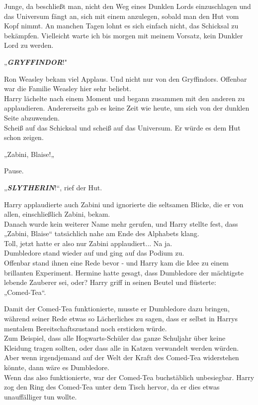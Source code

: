 {Junge, da beschließt man, nicht den Weg eines Dunklen Lords einzuschlagen und das Universum fängt an, sich mit einem anzulegen, sobald man den Hut vom Kopf nimmt. An manchen Tagen lohnt es sich einfach nicht, das Schicksal zu bekämpfen. Vielleicht warte ich bis morgen mit meinem Vorsatz, kein Dunkler Lord zu werden.

„\textbf{\emph{GRYFFINDOR}}!"

Ron Weasley bekam viel Applaus. Und nicht nur von den Gryffindors. Offenbar war die Familie Weasley hier sehr beliebt.\\ Harry lächelte nach einem Moment und begann zusammen mit den anderen zu applaudieren. Andererseits gab es keine Zeit wie heute, um sich von der dunklen Seite abzuwenden.\\ Scheiß auf das Schicksal und scheiß auf das Universum. Er würde es dem Hut schon zeigen.

„Zabini, Blaise!„

Pause.

„\textbf{\emph{SLYTHERIN}}!“, rief der Hut.

Harry applaudierte auch Zabini und ignorierte die seltsamen Blicke, die er von allen, einschließlich Zabini, bekam.\\ Danach wurde kein weiterer Name mehr gerufen, und Harry stellte fest, dass\\ „Zabini, Blaise“ tatsächlich nahe am Ende des Alphabets klang.\\ Toll, jetzt hatte er also nur Zabini applaudiert... Na ja.\\ Dumbledore stand wieder auf und ging auf das Podium zu.\\ Offenbar stand ihnen eine Rede bevor - und Harry kam die Idee zu einem brillanten Experiment. Hermine hatte gesagt, dass Dumbledore der mächtigste lebende Zauberer sei, oder? Harry griff in seinen Beutel und flüsterte:\\ „Comed-Tea“.

Damit der Comed-Tea funktionierte, musste er Dumbledore dazu bringen, während seiner Rede etwas so Lächerliches zu sagen, dass er selbst in Harrys mentalem Bereitschaftszustand noch ersticken würde.\\ Zum Beispiel, dass alle Hogwarts-Schüler das ganze Schuljahr über keine Kleidung tragen sollten, oder dass alle in Katzen verwandelt werden würden.\\ Aber wenn irgendjemand auf der Welt der Kraft des Comed-Tea widerstehen könnte, dann wäre es Dumbledore.\\ Wenn das also funktionierte, war der Comed-Tea buchstäblich unbesiegbar. Harry zog den Ring des Comed-Tea unter dem Tisch hervor, da er dies etwas unauffälliger tun wollte.

}
